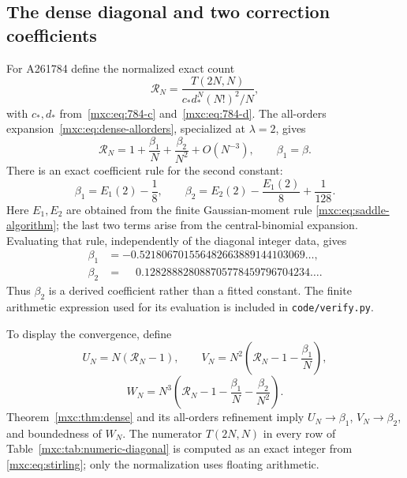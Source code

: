 \documentclass[11pt]{article}
\numberwithin{equation}{section}
\theoremstyle{definition}
\theoremstyle{remark}
\begin{document}
\subsection{The dense diagonal and two correction coefficients}
For A261784 define the normalized exact count
\[
 \mathcal R_N=\frac{T(2N,N)}{c_*d_*^N(N!)^2/N},
\]
with $c_*,d_*$ from~\eqref{mxc:eq:784-c} and~\eqref{mxc:eq:784-d}.
The all-orders expansion~\eqref{mxc:eq:dense-allorders}, specialized at
$\lambda=2$, gives
\[
 \mathcal R_N=1+\frac{\beta_1}{N}+\frac{\beta_2}{N^2}
                  +O(N^{-3}),\qquad \beta_1=\beta.
\]
There is an exact coefficient rule for the second constant:
\begin{equation}\label{mxc:eq:numeric-beta2}
 \beta_1=E_1(2)-\frac18,\qquad
 \beta_2=E_2(2)-\frac{E_1(2)}8+\frac1{128}.
\end{equation}
Here $E_1,E_2$ are obtained from the finite Gaussian-moment rule
\eqref{mxc:eq:saddle-algorithm}; the last two terms arise from the
central-binomial expansion. Evaluating that rule, independently of
the diagonal integer data, gives
\begin{align*}
 \beta_1&=-0.521806701556482663889144103069\ldots,\\
 \beta_2&=\phantom{-}0.128288828088705778459796704234\ldots.
\end{align*}
Thus $\beta_2$ is a derived coefficient rather than a fitted constant.
The finite arithmetic expression used for its evaluation is included
in \texttt{code/verify.py}.

To display the convergence, define
\[
 U_N=N(\mathcal R_N-1),\qquad
 V_N=N^2\left(\mathcal R_N-1-\frac{\beta_1}{N}\right),
\]
\[
 W_N=N^3\left(\mathcal R_N-1-\frac{\beta_1}{N}
                                -\frac{\beta_2}{N^2}\right).
\]
Theorem~\ref{mxc:thm:dense} and its all-orders refinement imply
$U_N\to\beta_1$, $V_N\to\beta_2$, and boundedness of $W_N$.
The numerator $T(2N,N)$ in every row of
Table~\ref{mxc:tab:numeric-diagonal} is computed as an exact integer from
\eqref{mxc:eq:stirling}; only the normalization uses floating arithmetic.
\end{document}
